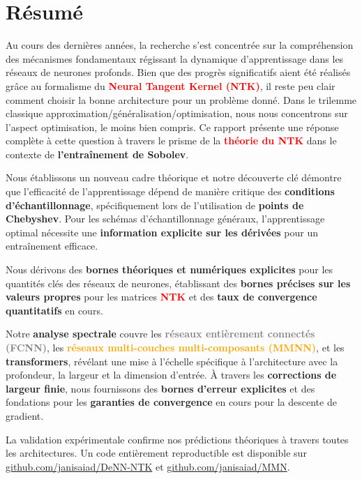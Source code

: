 \documentclass[a4paper]{article}
\theoremstyle{plain}
\theoremstyle{definition}
\theoremstyle{remark}
\begin{document}
\section*{Résumé}
Au cours des dernières années, la recherche s'est concentrée sur la compréhension des mécanismes fondamentaux régissant la dynamique d'apprentissage dans les réseaux de neurones profonds. Bien que des progrès significatifs aient été réalisés grâce au formalisme du \textcolor{red}{\textbf{Neural Tangent Kernel (NTK)}}, il reste peu clair comment choisir la bonne architecture pour un problème donné. Dans le trilemme classique approximation/généralisation/optimisation, nous nous concentrons sur l'aspect optimisation, le moins bien compris. Ce rapport présente une réponse complète à cette question à travers le prisme de la \textcolor{red}{\textbf{théorie du NTK}} dans le contexte de \textbf{l'entraînement de Sobolev}.

Nous établissons un nouveau cadre théorique et notre découverte clé démontre que l'efficacité de l'apprentissage dépend de manière critique des \textbf{conditions d'échantillonnage}, spécifiquement lors de l'utilisation de \textbf{points de Chebyshev}. Pour les schémas d'échantillonnage généraux, l'apprentissage optimal nécessite une \textbf{information explicite sur les dérivées} pour un entraînement efficace. 

Nous dérivons des \textbf{bornes théoriques et numériques explicites} pour les quantités clés des réseaux de neurones, établissant des \textbf{bornes précises sur les valeurs propres} pour les matrices \textcolor{red}{\textbf{NTK}} et des \textbf{taux de convergence quantitatifs} en cours.

Notre \textbf{analyse spectrale} couvre les \textcolor{gray}{\textbf{réseaux entièrement connectés (FCNN)}}, les \textcolor{orange}{\textbf{réseaux multi-couches multi-composants (MMNN)}}, et les \textbf{transformers}, révélant une mise à l'échelle spécifique à l'architecture avec la profondeur, la largeur et la dimension d'entrée. À travers les \textbf{corrections de largeur finie}, nous fournissons des \textbf{bornes d'erreur explicites} et des fondations pour les \textbf{garanties de convergence} en cours pour la descente de gradient.

La validation expérimentale confirme nos prédictions théoriques à travers toutes les architectures. Un code entièrement reproductible est disponible sur \href{https://github.com/janisaiad/DeNN-NTK}{github.com/janisaiad/DeNN-NTK} et \href{https://github.com/janisaiad/MMN}{github.com/janisaiad/MMN}.
\newpage
\end{document}
